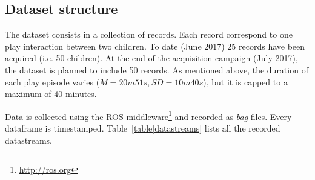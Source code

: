 \documentclass{article}
\newcommand{\ie}{i.e.\xspace}
\begin{document}
%
%
%
%
%



\subsection{Dataset structure}

The dataset consists in a collection of records. Each record correspond to one
play interaction between two children. To date (June 2017) 25 records have been acquired (\ie 50 children). At the end of the acquisition campaign
(July 2017), the dataset is planned to include 50 records. As
mentioned above, the duration of each play episode varies ($M=20m51s,
SD=10m40s$), but it is capped to a maximum of 40 minutes.

Data is collected using the ROS middleware\footnote{\url{http://ros.org}} and
recorded as \emph{bag} files. Every dataframe is timestamped.
Table~\ref{table|datastreams} lists all the recorded datastreams.
\end{document}
